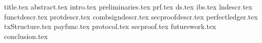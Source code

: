 \documentclass{llncs}
\begin{document}
\pagestyle{plain}
{title.tex}
{abstract.tex}
{intro.tex}
{preliminaries.tex}
{prf.tex}
{ds.tex}
{ibs.tex}
{lndescr.tex}
{functdescr.tex}
{protdescr.tex}
{combsigndescr.tex}
{secproofdescr.tex}
{perfectledger.tex}
{txStructure.tex}
{payfunc.tex}
{protocol.tex}
{secproof.tex}
{futurework.tex}
{conclusion.tex}



\end{document}
